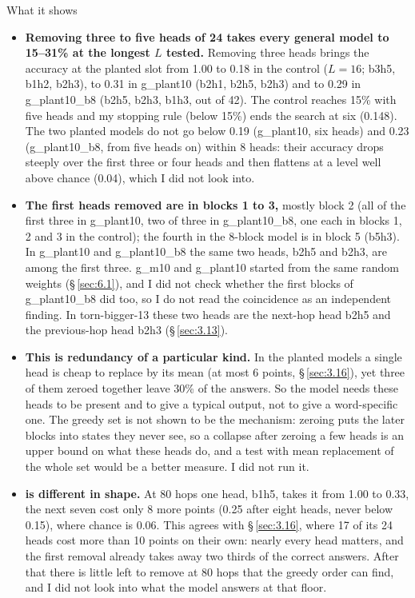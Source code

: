 \documentclass[paper=a4,fontsize=11pt,DIV=11,parskip=half,headings=small,numbers=noendperiod]{scrartcl}
\DeclareRobustCommand{\lead}[1]{\textsf{\bfseries\color{accent}#1}}
\DeclareRobustCommand{\code}[1]{{\fontseries{m}\ttfamily #1}}
\begin{document}
\begin{findbox}{What it shows}
\begin{itemize}
\item \lead{Removing three to five heads of 24 takes every general model to 15–31\% at the longest $L$ tested.}
  Removing three heads brings the accuracy at the planted slot from 1.00 to 0.18 in the control ($L=16$; b3h5,
  b1h2, b2h3), to 0.31 in \code{g\_\allowbreak{}plant10} (b2h1, b2h5, b2h3) and to 0.29 in
  \code{g\_\allowbreak{}plant10\_\allowbreak{}b8} (b2h5, b2h3, b1h3, out of 42). The control reaches 15\% with
  five heads and my stopping rule (below 15\%) ends the search at six (0.148). The two planted models do not go
  below 0.19 (\code{g\_\allowbreak{}plant10}, six heads) and 0.23
  (\code{g\_\allowbreak{}plant10\_\allowbreak{}b8}, from five heads on) within 8 heads: their accuracy drops
  steeply over the first three or four heads and then flattens at a level well above chance (0.04), which I did
  not look into.
\item \lead{The first heads removed are in blocks 1 to 3,} mostly block 2 (all of the first three in
  \code{g\_\allowbreak{}plant10}, two of three in \code{g\_\allowbreak{}plant10\_\allowbreak{}b8}, one each in
  blocks 1, 2 and 3 in the control); the fourth in the 8-block model is in block 5 (b5h3). In
  \code{g\_\allowbreak{}plant10} and \code{g\_\allowbreak{}plant10\_\allowbreak{}b8} the same two heads, b2h5
  and b2h3, are among the first three. \code{g\_\allowbreak{}m10} and \code{g\_\allowbreak{}plant10} started
  from the same random weights (\S\,\ref{sec:6.1}), and I did not check whether the first blocks of
  \code{g\_\allowbreak{}plant10\_\allowbreak{}b8} did too, so I do not read the coincidence as an independent
  finding. In \code{torn-\allowbreak{}bigger-\allowbreak{}13} these two heads are the next-hop head b2h5 and the
  previous-hop head b2h3 (\S\,\ref{sec:3.13}).
\item \lead{This is redundancy of a particular kind.} In the planted models a single head is cheap to replace by
  its mean (at most 6 points, \S\,\ref{sec:3.16}), yet three of them zeroed together leave 30\% of the answers.
  So the model needs these heads to be present and to give a typical output, not to give a word-specific one.
  The greedy set is not shown to be the mechanism: zeroing puts the later blocks into states they never see, so
  a collapse after zeroing a few heads is an upper bound on what these heads do, and a test with mean
  replacement of the whole set would be a better measure. I did not run it.
\item \lead{\code{e\_\allowbreak{}base} is different in shape.} At 80 hops one head, b1h5, takes it from 1.00 to
  0.33, the next seven cost only 8 more points (0.25 after eight heads, never below 0.15), where chance is 0.06.
  This agrees with \S\,\ref{sec:3.16}, where 17 of its 24 heads cost more than 10 points on their own: nearly
  every head matters, and the first removal already takes away two thirds of the correct answers. After that
  there is little left to remove at 80 hops that the greedy order can find, and I did not look into what the
  model answers at that floor.
\end{itemize}
\end{findbox}
\end{document}
